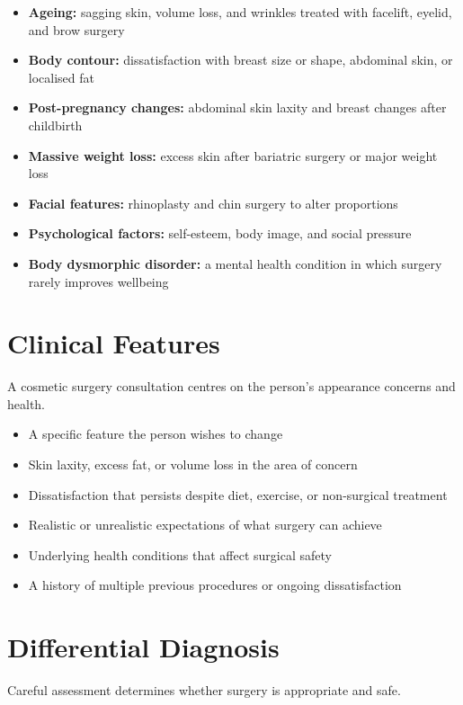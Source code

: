 \begin{itemize}
    \item \textbf{Ageing:} sagging skin, volume loss, and wrinkles treated with facelift, eyelid, and brow surgery
    \item \textbf{Body contour:} dissatisfaction with breast size or shape, abdominal skin, or localised fat
    \item \textbf{Post-pregnancy changes:} abdominal skin laxity and breast changes after childbirth
    \item \textbf{Massive weight loss:} excess skin after bariatric surgery or major weight loss
    \item \textbf{Facial features:} rhinoplasty and chin surgery to alter proportions
    \item \textbf{Psychological factors:} self-esteem, body image, and social pressure
    \item \textbf{Body dysmorphic disorder:} a mental health condition in which surgery rarely improves wellbeing
\end{itemize}

\section*{Clinical Features}
A cosmetic surgery consultation centres on the person's appearance concerns and health.

\begin{itemize}
    \item A specific feature the person wishes to change
    \item Skin laxity, excess fat, or volume loss in the area of concern
    \item Dissatisfaction that persists despite diet, exercise, or non-surgical treatment
    \item Realistic or unrealistic expectations of what surgery can achieve
    \item Underlying health conditions that affect surgical safety
    \item A history of multiple previous procedures or ongoing dissatisfaction
\end{itemize}

\section*{Differential Diagnosis}
Careful assessment determines whether surgery is appropriate and safe.

